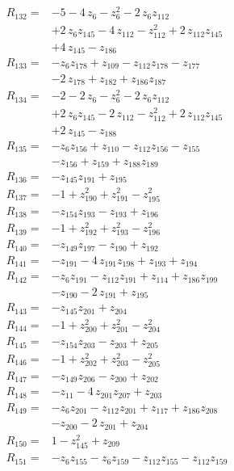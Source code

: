 \begin{align*}
R_{132}={}&-5 -4\,z_{6} -z_{6}^{2} -2\,z_{6}z_{112}\\
&+2\,z_{6}z_{145} -4\,z_{112} -z_{112}^{2} +2\,z_{112}z_{145}\\
&+4\,z_{145} -z_{186}\\[2pt]
R_{133}={}&-z_{6}z_{178} +z_{109} -z_{112}z_{178} -z_{177}\\
&-2\,z_{178} +z_{182} +z_{186}z_{187}\\[2pt]
R_{134}={}&-2 -2\,z_{6} -z_{6}^{2} -2\,z_{6}z_{112}\\
&+2\,z_{6}z_{145} -2\,z_{112} -z_{112}^{2} +2\,z_{112}z_{145}\\
&+2\,z_{145} -z_{188}\\[2pt]
R_{135}={}&-z_{6}z_{156} +z_{110} -z_{112}z_{156} -z_{155}\\
&-z_{156} +z_{159} +z_{188}z_{189}\\[2pt]
R_{136}={}&-z_{145}z_{191} +z_{195}\\[2pt]
R_{137}={}&-1 +z_{190}^{2} +z_{191}^{2} -z_{195}^{2}\\[2pt]
R_{138}={}&-z_{154}z_{193} -z_{193} +z_{196}\\[2pt]
R_{139}={}&-1 +z_{192}^{2} +z_{193}^{2} -z_{196}^{2}\\[2pt]
R_{140}={}&-z_{149}z_{197} -z_{190} +z_{192}\\[2pt]
R_{141}={}&-z_{191} -4\,z_{191}z_{198} +z_{193} +z_{194}\\[2pt]
R_{142}={}&-z_{6}z_{191} -z_{112}z_{191} +z_{114} +z_{186}z_{199}\\
&-z_{190} -2\,z_{191} +z_{195}\\[2pt]
R_{143}={}&-z_{145}z_{201} +z_{204}\\[2pt]
R_{144}={}&-1 +z_{200}^{2} +z_{201}^{2} -z_{204}^{2}\\[2pt]
R_{145}={}&-z_{154}z_{203} -z_{203} +z_{205}\\[2pt]
R_{146}={}&-1 +z_{202}^{2} +z_{203}^{2} -z_{205}^{2}\\[2pt]
R_{147}={}&-z_{149}z_{206} -z_{200} +z_{202}\\[2pt]
R_{148}={}&-z_{11} -4\,z_{201}z_{207} +z_{203}\\[2pt]
R_{149}={}&-z_{6}z_{201} -z_{112}z_{201} +z_{117} +z_{186}z_{208}\\
&-z_{200} -2\,z_{201} +z_{204}\\[2pt]
R_{150}={}&1 -z_{145}^{2} +z_{209}\\[2pt]
R_{151}={}&-z_{6}z_{155} -z_{6}z_{159} -z_{112}z_{155} -z_{112}z_{159}\\

\end{align*}
